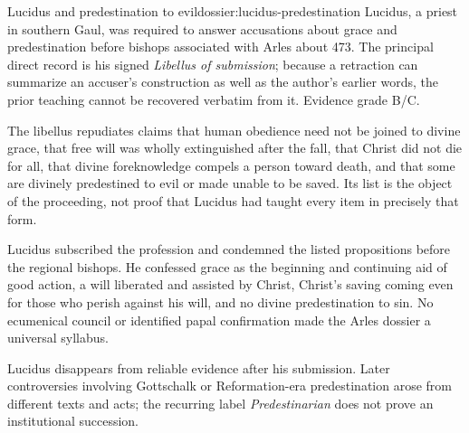 \begin{heresydossier}{Lucidus and predestination to evil}{dossier:lucidus-predestination}
\objectfield Lucidus, a priest in southern Gaul, was required to answer accusations about grace and predestination before bishops associated with Arles about 473. The principal direct record is his signed \emph{Libellus of submission}; because a retraction can summarize an accuser's construction as well as the author's earlier words, the prior teaching cannot be recovered verbatim from it. Evidence grade B/C.

\propositionfield The libellus repudiates claims that human obedience need not be joined to divine grace, that free will was wholly extinguished after the fall, that Christ did not die for all, that divine foreknowledge compels a person toward death, and that some are divinely predestined to evil or made unable to be saved. Its list is the object of the proceeding, not proof that Lucidus had taught every item in precisely that form.

\responsefield Lucidus subscribed the profession and condemned the listed propositions before the regional bishops. He confessed grace as the beginning and continuing aid of good action, a will liberated and assisted by Christ, Christ's saving coming even for those who perish against his will, and no divine predestination to sin. No ecumenical council or identified papal confirmation made the Arles dossier a universal syllabus.

\aftermathfield Lucidus disappears from reliable evidence after his submission. Later controversies involving Gottschalk or Reformation-era predestination arose from different texts and acts; the recurring label \emph{Predestinarian} does not prove an institutional succession.
\end{heresydossier}

